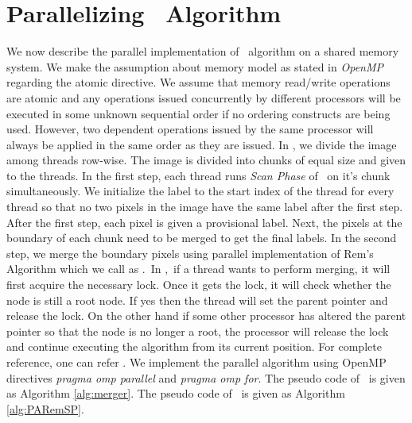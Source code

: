 \vspace{\sectionSpace}
\section{Parallelizing \aremsp\ Algorithm}
\label{sec:parallel_algo}

We now describe the parallel implementation of \aremsp\ algorithm 
on a shared memory system. We make the assumption about memory
model as stated in {\em OpenMP} regarding the atomic directive. We assume that
memory read/write operations are atomic and any operations issued concurrently by different processors will be executed in some unknown sequential order if
no ordering constructs are being used. However, two dependent operations issued
by the same processor will always be applied in the same order as they are
issued.
%
In \paremsp, we divide the image among threads row-wise. The image is
divided into chunks of equal size and given to the threads. In the first step,
each thread runs {\em Scan Phase} of \aremsp\ on it's chunk simultaneously. We
initialize the label to the start index of the thread for every thread so that no 
two pixels in the image have the same label after the first step. After the first step, 
each pixel is given a provisional label. Next, the pixels at the boundary of
each chunk need to be merged to get the final labels. In the second step, we merge the boundary pixels using parallel 
implementation of Rem's Algorithm \cite{Patwary2012_PARemSP} which we call as
\merger.\ In \merger,\ if a thread wants to perform merging, it will first
acquire the necessary lock. Once it gets the lock, it will check whether the
node is still a root node. If yes then the thread
will set the parent pointer and release the lock. On the other
hand if some other processor has altered the parent pointer so
that the node is no longer a root, the processor will release
the lock and continue executing the algorithm from its current
position. For complete reference, one can refer \cite{Patwary2012_PARemSP}. We
implement the parallel algorithm using OpenMP directives {\em pragma omp parallel} and {\em pragma omp for}. 
The pseudo code of \merger\ is given as Algorithm \ref{alg:merger}. 
The pseudo code of \paremsp\ is given as Algorithm
\ref{alg:PARemSP}.

 
  